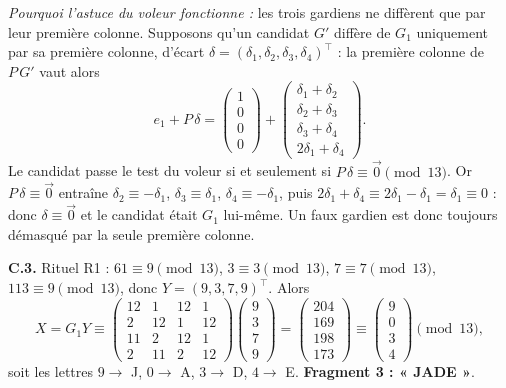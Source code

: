 \documentclass[11pt,a4paper]{article}
\begin{document}
\emph{Pourquoi l'astuce du voleur fonctionne :} les trois gardiens ne
diffèrent que par leur première colonne. Supposons qu'un candidat $G'$
diffère de $G_1$ uniquement par sa première colonne, d'écart
$\delta = (\delta_1,\delta_2,\delta_3,\delta_4)^{\!\top}$ : la première
colonne de $P\,G'$ vaut alors
\[
e_1 + P\,\delta
= \begin{pmatrix}1\\0\\0\\0\end{pmatrix}
+ \begin{pmatrix}\delta_1+\delta_2\\ \delta_2+\delta_3\\
	\delta_3+\delta_4\\ 2\delta_1+\delta_4\end{pmatrix}.
\]
Le candidat passe le test du voleur si et seulement si $P\,\delta \equiv
\vec{0} \pmod{13}$. Or $P\,\delta \equiv \vec{0}$ entraîne
$\delta_2 \equiv -\delta_1$, $\delta_3 \equiv \delta_1$,
$\delta_4 \equiv -\delta_1$, puis
$2\delta_1 + \delta_4 \equiv 2\delta_1 - \delta_1 = \delta_1 \equiv 0$ :
donc $\delta \equiv \vec{0}$ et le candidat était $G_1$ lui-même. Un faux
gardien est donc toujours démasqué par la seule première colonne.

\textbf{C.3.} Rituel R1 : $61 \equiv 9 \pmod{13}$,
$3 \equiv 3 \pmod{13}$, $7 \equiv 7 \pmod{13}$,
$113 \equiv 9 \pmod{13}$, donc $Y = (9,3,7,9)^{\!\top}$.
Alors
\[
X = G_1 Y \equiv \begin{pmatrix}
	12&1&12&1\\2&12&1&12\\11&2&12&1\\2&11&2&12
\end{pmatrix}
\begin{pmatrix}9\\3\\7\\9\end{pmatrix}
= \begin{pmatrix}204\\169\\198\\173\end{pmatrix}
\equiv \begin{pmatrix}9\\0\\3\\4\end{pmatrix} \pmod{13},
\]
soit les lettres $9 \to$ J, $0 \to$ A, $3 \to$ D, $4 \to$ E.
\textbf{Fragment 3 : « JADE »}.
\end{document}
